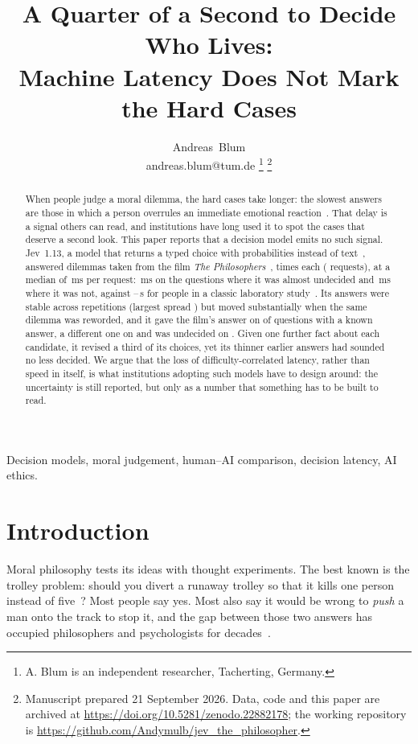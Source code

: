 \documentclass[journal]{IEEEtran}
\title{A Quarter of a Second to Decide Who Lives:\\
  Machine Latency Does Not Mark the Hard Cases}
\author{Andreas~Blum\\[2pt]
  \normalsize andreas.blum@tum.de%
\thanks{A. Blum is an independent researcher, Tacherting, Germany.}%
\thanks{Manuscript prepared 21 September 2026. Data, code and this paper are archived at \url{https://doi.org/10.5281/zenodo.22882178}; the working repository is \url{https://github.com/Andymulb/jev_the_philosopher}.}}
\begin{document}
\maketitle

\begin{abstract}
\noindent When people judge a moral dilemma, the hard cases take longer: the slowest answers are
those in which a person overrules an immediate emotional reaction~\cite{greene2001}. That delay is
a signal others can read, and institutions have long used it to spot the cases that deserve a
second look. This paper reports that a decision model emits no such signal. Jev~1.13, a model that
returns a typed choice with probabilities instead of text~\cite{typesafe_blog}, answered
\NQuestionIds{} dilemmas taken from the film \emph{The Philosophers}~\cite{huddles2013},
\NRuns{} times each (\NRequests{} requests), at a median of \LatMedian\,ms per request:
\LatTorn\,ms on the questions where it was almost undecided and \LatSure\,ms where it was not,
against \HumanFastest--\HumanSlowest\,s for people in a classic laboratory study~\cite{greene2001}.
Its answers were stable across repetitions (largest spread \MaxSpread) but moved substantially when
the same dilemma was reworded, and it gave the film's answer on \NAgree{} of \NFilmQuestions{}
questions with a known answer, a different one on \NDisagree{} and was undecided on \NUndecided.
Given one further fact about each candidate, it revised a third of its choices, yet its thinner
earlier answers had sounded no less decided. We argue
that the loss of difficulty-correlated latency, rather than speed in itself, is what institutions
adopting such models have to design around: the uncertainty is still reported, but only as a number
that something has to be built to read.
\end{abstract}

\begin{IEEEkeywords}
Decision models, moral judgement, human--AI comparison, decision latency, AI ethics.
\end{IEEEkeywords}


\section{Introduction}

Moral philosophy tests its ideas with thought experiments. The best known is the trolley problem:
should you divert a runaway trolley so that it kills one person instead of
five~\cite{foot1967,thomson1976,thomson1985}? Most people say yes. Most also say it would be wrong
to \emph{push} a man onto the track to stop it, and the gap between those two answers has occupied
philosophers and psychologists for decades~\cite{thomson1985,greene2001}.
\end{document}
